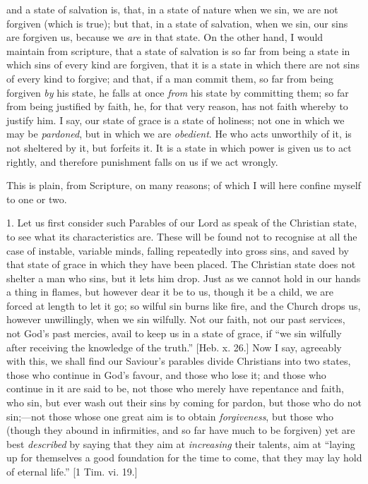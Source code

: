 and a state of salvation is, that, in a state of nature when we sin,
we are not forgiven (which is true); but that, in a state of
salvation, when we sin, our sins are forgiven us, because we \emph{are} in
that state. On the other hand, I would maintain from scripture, that a
state of salvation is so far from being a state in which sins of every
kind are forgiven, that it is a state in which there are not sins of
every kind to forgive; and that, if a man commit them, so far from
being forgiven \emph{by} his state, he falls at once \emph{from} his
state by committing them; so far from being justified by faith, he,
for that very reason, has not faith whereby to justify him. I say, our
state of grace is a state of holiness; not one in which we may be \emph{pardoned},
but in which we are \emph{obedient}. He who acts unworthily of it, is
not sheltered by it, but forfeits it. It is a state in which power is
given us to act rightly, and therefore punishment falls on us if we
act wrongly.

This is plain, from Scripture, on many reasons; of which I will
here confine myself to one or two.

1. Let us first consider such Parables of our Lord as speak of the
Christian state, to see what its characteristics are. These will be
found not to recognise at all the case of instable, variable minds,
falling repeatedly into gross sins, and saved by that state of grace
in which they have been placed. The Christian state does not shelter a
man who sins, but it lets him drop. Just as we cannot hold in our
hands a thing in flames, but however dear it be to us, though it be a
child, we are forced at length to let it go; so wilful sin burns like
fire, and the Church drops us, however unwillingly, when we sin
wilfully. Not our faith, not our past services, not God's past
mercies, avail to keep us in a state of grace, if ``we sin
wilfully after receiving the knowledge of the truth.'' [Heb. x.
26.] Now I say, agreeably with this, we shall find our Saviour's
parables divide Christians into two states, those who continue in
God's favour, and those who lose it; and those who continue in it are
said to be, not those who merely have repentance and faith, who sin,
but ever wash out their sins by coming for pardon, but those who do
not sin;—not those whose one great aim is to obtain \emph{forgiveness},
but those who (though they abound in infirmities, and so far have much
to be forgiven) yet are best \emph{described} by saying that they aim
at \emph{increasing} their talents, aim at ``laying up for
themselves a good foundation for the time to come, that they may lay
hold of eternal life.'' [1 Tim. vi. 19.]

